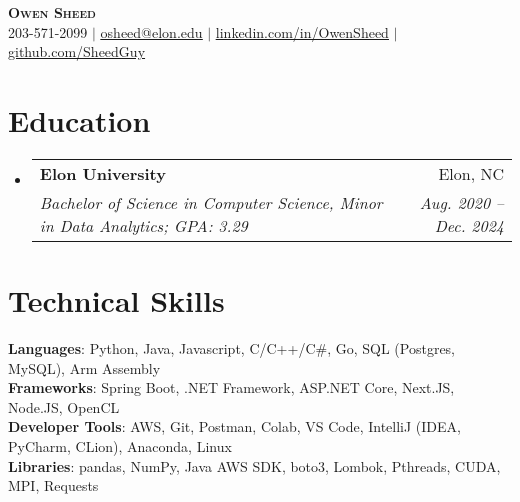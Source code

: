 \documentclass[letterpaper,11pt]{article}
\makeatletter
\newcommand{\resumeSubheading}[4]{
  \vspace{-2pt}\item
    \begin{tabular*}{0.97\textwidth}[t]{l@{\extracolsep{\fill}}r}
      \textbf{#1} & #2 \\
      \textit{\small#3} & \textit{\small #4} \\
    \end{tabular*}\vspace{-7pt}
}
\newcommand{\resumeSubHeadingListStart}{\begin{itemize}[leftmargin=0.15in, label={}]}
\newcommand{\resumeSubHeadingListEnd}{\end{itemize}}
\makeatother
\begin{document}
\begin{center}
  \textbf{\Huge \scshape Owen Sheed} \\ \vspace{1pt}
  \small 203-571-2099 $|$
  \href{mailto:osheed@elon.edu}{\uline{osheed@elon.edu}} $|$ 
  \href{https://www.linkedin.com/in/owensheed/}{\uline{linkedin.com/in/OwenSheed}} $|$
  \href{https://github.com/SheedGuy}{\uline{github.com/SheedGuy}}
\end{center}


\section{Education}
  \resumeSubHeadingListStart
    \resumeSubheading
      {Elon University}{Elon, NC}
      {Bachelor of Science in Computer Science, Minor in Data Analytics; GPA: 3.29}{Aug. 2020 -- Dec. 2024}
  \resumeSubHeadingListEnd

\section{Technical Skills}
 \begin{itemize}[leftmargin=0.15in, label={}]
    \small{\item{
     \textbf{Languages}{: Python, Java, Javascript, C/C++/C\#, Go, SQL (Postgres, MySQL), Arm Assembly} \\
     \textbf{Frameworks}{: Spring Boot, .NET Framework, ASP.NET Core, Next.JS, Node.JS, OpenCL} \\
     \textbf{Developer Tools}{: AWS, Git, Postman, Colab, VS Code, IntelliJ (IDEA, PyCharm, CLion), Anaconda, Linux} \\
     \textbf{Libraries}{: pandas, NumPy, Java AWS SDK, boto3, Lombok, Pthreads, CUDA, MPI, Requests}
    }}
 \end{itemize}
\end{document}
